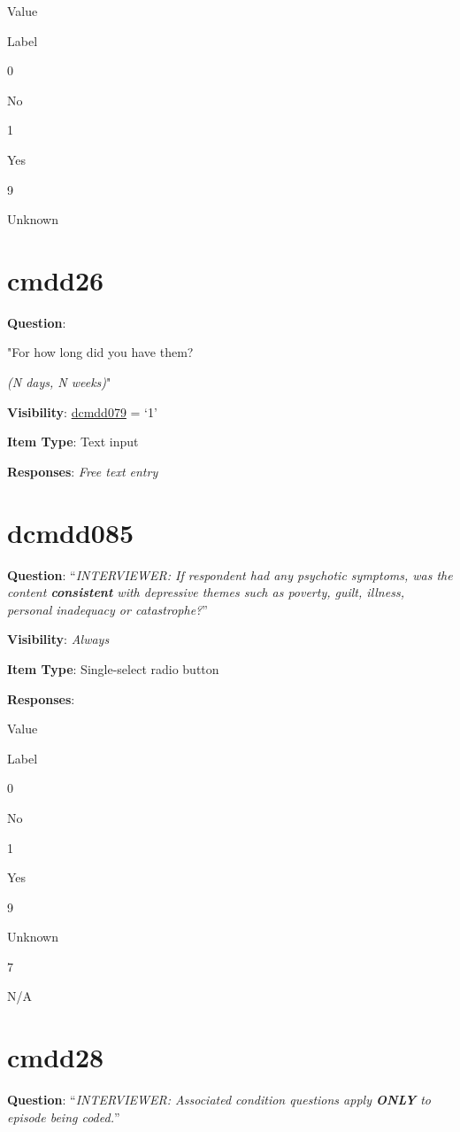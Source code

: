 \documentclass[]{book}
\begin{document}
Value

Label

0

No

1

Yes

9

Unknown

\hypertarget{cmdd26}{%
\section{cmdd26}\label{cmdd26}}

\textbf{Question}:

"For how long did you have them?

\emph{(N days, N weeks)}"

\textbf{Visibility}: \protect\hyperlink{dcmdd079}{dcmdd079} = `1'

\textbf{Item Type}: Text input

\textbf{Responses}: \emph{Free text entry}

\hypertarget{dcmdd085}{%
\section{dcmdd085}\label{dcmdd085}}

\textbf{Question}: ``\emph{INTERVIEWER: If respondent had any psychotic symptoms, was the content \textbf{consistent} with depressive themes such as poverty, guilt, illness, personal inadequacy or catastrophe?}''

\textbf{Visibility}: \emph{Always}

\textbf{Item Type}: Single-select radio button

\textbf{Responses}:

Value

Label

0

No

1

Yes

9

Unknown

7

N/A

\hypertarget{cmdd28}{%
\section{cmdd28}\label{cmdd28}}

\textbf{Question}: ``\emph{INTERVIEWER: Associated condition questions apply \textbf{ONLY} to episode being coded.}''
\end{document}
